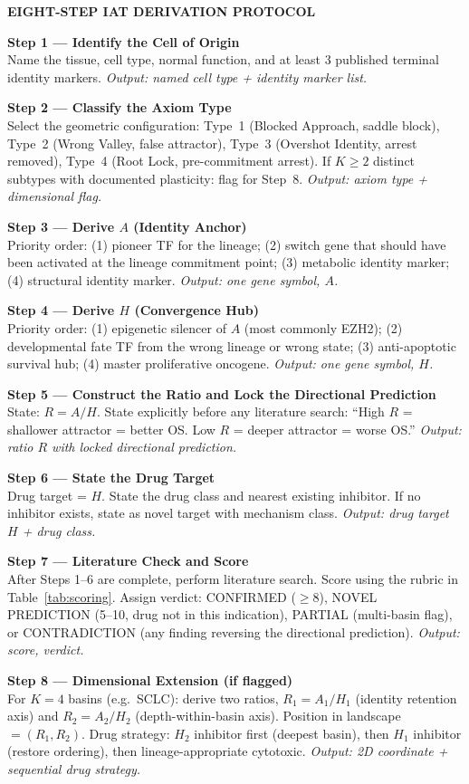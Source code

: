 \documentclass[11pt, a4paper]{article}
\begin{document}
\begin{protocolenv}
\textbf{EIGHT-STEP IAT DERIVATION PROTOCOL}

\medskip
\textbf{Step 1 --- Identify the Cell of Origin}\\
Name the tissue, cell type, normal function, and
at least 3 published terminal identity markers.
\emph{Output: named cell type + identity marker list.}

\medskip
\textbf{Step 2 --- Classify the Axiom Type}\\
Select the geometric configuration:
Type~1 (Blocked Approach, saddle block),
Type~2 (Wrong Valley, false attractor),
Type~3 (Overshot Identity, arrest removed),
Type~4 (Root Lock, pre-commitment arrest).
If $K \geq 2$ distinct subtypes with documented
plasticity: flag for Step~8.
\emph{Output: axiom type + dimensional flag.}

\medskip
\textbf{Step 3 --- Derive $A$ (Identity Anchor)}\\
Priority order: (1) pioneer TF for the lineage;
(2) switch gene that should have been activated
at the lineage commitment point; (3) metabolic
identity marker; (4) structural identity marker.
\emph{Output: one gene symbol, $A$.}

\medskip
\textbf{Step 4 --- Derive $H$ (Convergence Hub)}\\
Priority order: (1) epigenetic silencer of $A$
(most commonly EZH2); (2) developmental fate TF
from the wrong lineage or wrong state;
(3) anti-apoptotic survival hub; (4) master
proliferative oncogene.
\emph{Output: one gene symbol, $H$.}

\medskip
\textbf{Step 5 --- Construct the Ratio and Lock
the Directional Prediction}\\
State: $R = A/H$. State explicitly before any
literature search: ``High $R$ = shallower attractor
= better OS. Low $R$ = deeper attractor = worse OS.''
\emph{Output: ratio $R$ with locked directional prediction.}

\medskip
\textbf{Step 6 --- State the Drug Target}\\
Drug target = $H$. State the drug class and
nearest existing inhibitor. If no inhibitor exists,
state as novel target with mechanism class.
\emph{Output: drug target $H$ + drug class.}

\medskip
\textbf{Step 7 --- Literature Check and Score}\\
After Steps 1--6 are complete, perform literature
search. Score using the rubric in Table~\ref{tab:scoring}.
Assign verdict: CONFIRMED ($\geq$8), NOVEL PREDICTION
(5--10, drug not in this indication), PARTIAL
(multi-basin flag), or CONTRADICTION (any finding
reversing the directional prediction).
\emph{Output: score, verdict.}

\medskip
\textbf{Step 8 --- Dimensional Extension (if flagged)}\\
For $K=4$ basins (e.g.\ SCLC): derive two ratios,
$R_1 = A_1/H_1$ (identity retention axis) and
$R_2 = A_2/H_2$ (depth-within-basin axis). Position
in landscape $= (R_1, R_2)$. Drug strategy:
$H_2$ inhibitor first (deepest basin), then $H_1$
inhibitor (restore ordering), then lineage-appropriate
cytotoxic.
\emph{Output: 2D coordinate + sequential drug strategy.}
\end{protocolenv}
\end{document}

